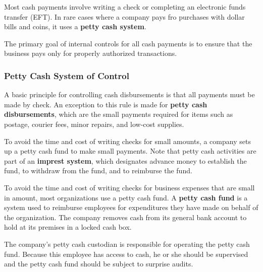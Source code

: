 \documentclass[../main.tex]{subfiles}
\begin{document}
	Most cash payments involve writing a check or completing an electronic 
	funds transfer (EFT). In rare cases where a company pays fro purchases with 
	dollar bills and coins, it uses a \textbf{petty cash system}. 
	
	The primary goal of internal controls for all cash payments is to ensure 
	that the business pays only for properly authorized transactions. 
	
	\subsubsection{Petty Cash System of Control}
	
	A basic principle for controlling cash disbursements is that all payments 
	must be made by check. An exception to this rule is made for \textbf{petty 
	cash disbursements}, which are the small payments required for items such 
	as postage, courier fees, minor repairs, and low-cost supplies.
	
	To avoid the time and cost of writing checks for small amounts, a company 
	sets up a petty cash fund to make small payments. Note that petty cash 
	activities are part of an \textbf{imprest system}, which designates advance 
	money to establish the fund, to withdraw from the fund, and to reimburse 
	the fund.
	
	To avoid the time and cost of writing checks for business expenses that are 
	small in amount, most organizations use a petty cash fund. A \textbf{petty 
	cash fund} is a system used to reimburse employees for expenditures they 
	have made on behalf of the organization. The company removes cash from its 
	general bank account to hold at its premises in a locked cash box. 
	
	The company’s petty cash custodian is responsible for operating the petty 
	cash 
	fund. Because this employee has access to cash, he or she should be 
	supervised and the petty cash fund should be subject to surprise audits.
	
\end{document}
